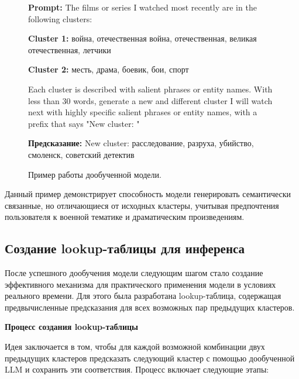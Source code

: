 \begin{figure}[H]
\centering
\begin{tcolorbox}[
    colback=gray!5,
    colframe=gray!50,
    boxrule=1pt,
    arc=2pt,
    left=10pt,
    right=10pt,
    top=10pt,
    bottom=10pt,
    width=0.9\textwidth
]
\small\ttfamily
\textbf{Prompt:} The films or series I watched most recently are in the following clusters:

\textbf{Cluster 1:} война, отечественная война, отечественная, великая отечественная, летчики

\textbf{Cluster 2:} месть, драма, боевик, бои, спорт

Each cluster is described with salient phrases or entity names.
With less than 30 words, generate a new and different cluster I will watch next
with highly specific salient phrases or entity names, with a prefix that says "New cluster: "

\textbf{Предсказание:} New cluster: расследование, разруха, убийство, смоленск, советский детектив
\end{tcolorbox}
\caption{Пример работы дообученной модели.}
\label{fig:model_example}
\end{figure}

Данный пример демонстрирует способность модели генерировать семантически связанные, но отличающиеся от исходных кластеры, учитывая предпочтения пользователя к военной тематике и драматическим произведениям.

\subsection*{Создание lookup-таблицы для инференса}

После успешного дообучения модели следующим шагом стало создание эффективного механизма для практического применения модели в условиях реального времени. Для этого была разработана lookup-таблица, содержащая предвычисленные предсказания для всех возможных пар предыдущих кластеров.

\textbf{Процесс создания lookup-таблицы}

Идея заключается в том, чтобы для каждой возможной комбинации двух предыдущих кластеров предсказать следующий кластер с помощью дообученной LLM и сохранить эти соответствия. Процесс включает следующие этапы:

